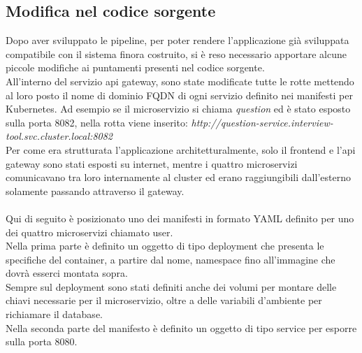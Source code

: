 \documentclass[a4paper,12pt]{report}
\begin{document}
\subsection{Modifica nel codice sorgente}
Dopo aver sviluppato le pipeline, per poter rendere l'applicazione già sviluppata compatibile con il sistema finora costruito, si è reso necessario apportare alcune piccole modifiche ai puntamenti presenti nel codice sorgente.\\
All'interno del servizio api gateway, sono state modificate tutte le rotte mettendo al loro posto il nome di dominio FQDN di ogni servizio definito nei manifesti per Kubernetes. Ad esempio se il microservizio si chiama \textit{question} ed è stato esposto sulla porta 8082, nella rotta viene inserito: \textit{http://question-service.interview-tool.svc.cluster.local:8082}\\
Per come era strutturata l'applicazione architetturalmente, solo il frontend e l'api gateway sono stati esposti su internet, mentre i quattro microservizi comunicavano tra loro internamente al cluster ed erano raggiungibili dall'esterno solamente passando attraverso il gateway.\\ \\
Qui di seguito è posizionato uno dei manifesti in formato YAML definito per uno dei quattro microservizi chiamato user.\\ 
Nella prima parte è definito un oggetto di tipo deployment che presenta le specifiche del container, a partire dal nome, namespace fino all'immagine che dovrà esserci montata sopra.\\ 
Sempre sul deployment sono stati definiti anche dei volumi per montare delle chiavi necessarie per il microservizio, oltre a delle variabili d'ambiente per richiamare il database.\\ 
Nella seconda parte del manifesto è definito un oggetto di tipo service per esporre sulla porta 8080. \\ \\ \\ 
\end{document}

